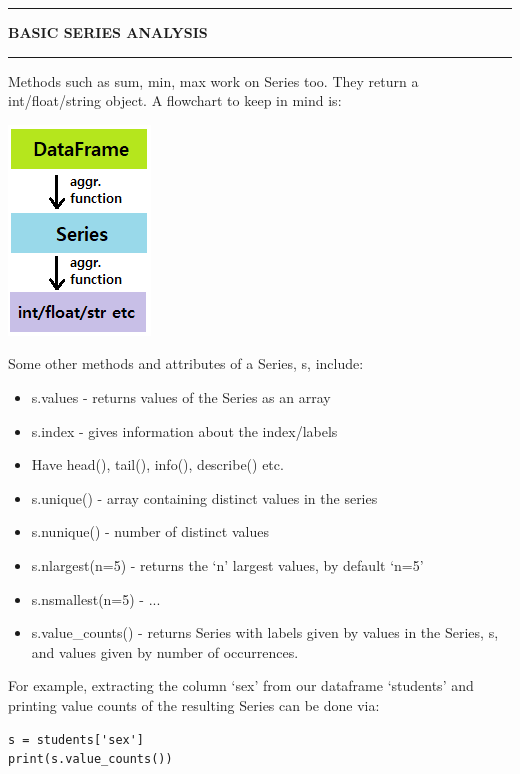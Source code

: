 \documentclass[8pt]{extarticle}
\newcommand{\heading}[1]{%
    \noindent
    \rule{\linewidth}{0.4pt}
    \begin{center}
        \vspace{-1ex}
        \textbf{#1}        
        \vspace{-2.5ex}
    \end{center}
    \rule{\linewidth}{0.4pt}
}
\begin{document}
\begin{multicols}{4}
\setlength{\columnseprule}{1pt} %

\heading{BASIC SERIES ANALYSIS}

Methods such as sum, min, max work on Series too. They return a int/float/string object. A flowchart to keep in mind is:


\begin{center}
\includegraphics[scale = 0.65]{images/agg_functions_flowchart.png}
\end{center}

Some other methods and attributes of a Series, s, include:

\begin{itemize}
    \item s.values - returns values of the Series as an array
    \item s.index - gives information about the index/labels
    \item Have head(), tail(), info(), describe() etc.
    \item s.unique() - array containing distinct values in the series
    \item s.nunique() - number of distinct values
    \item s.nlargest(n=5) - returns the `n' largest values, by default `n=5'
    \item s.nsmallest(n=5) - ...
    \item s.value\_counts() - returns Series with labels given by values in the Series, s, and values given by number of occurrences.
\end{itemize}

For example, extracting the column `sex' from our dataframe `students' and printing value counts of the resulting Series can be done via:

\begin{lstlisting}[style=Python]
s = students['sex']
print(s.value_counts())
\end{lstlisting}


\end{multicols}
\end{document}
